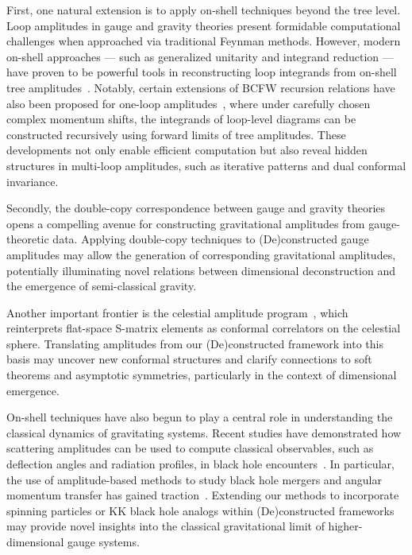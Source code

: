 \documentclass[12pt]{article}
\numberwithin{equation}{section}
\begin{document}
First, one natural extension is to apply on-shell techniques beyond the tree level. Loop amplitudes in gauge and gravity theories present formidable computational challenges when approached via traditional Feynman methods. However, modern on-shell approaches — such as generalized unitarity and integrand reduction — have proven to be powerful tools in reconstructing loop integrands from on-shell tree amplitudes~\cite{Bern:1994zx}. Notably, certain extensions of BCFW recursion relations have also been proposed for one-loop amplitudes~\cite{Kharel:2011vz}, where under carefully chosen complex momentum shifts, the integrands of loop-level diagrams can be constructed recursively using forward limits of tree amplitudes. These developments not only enable efficient computation but also reveal hidden structures in multi-loop amplitudes, such as iterative patterns and dual conformal invariance.


Secondly, the double-copy correspondence between gauge and gravity theories~\cite{Bern:2010ue} opens a compelling avenue for constructing gravitational amplitudes from gauge-theoretic data. Applying double-copy techniques to (De)constructed gauge amplitudes may allow the generation of corresponding gravitational amplitudes, potentially illuminating novel relations between dimensional deconstruction and the emergence of semi-classical gravity.

Another important frontier is the celestial amplitude program~\cite{Pasterski:2017kqt}, which reinterprets flat-space S-matrix elements as conformal correlators on the celestial sphere. Translating amplitudes from our (De)constructed framework into this basis may uncover new conformal structures and clarify connections to soft theorems and asymptotic symmetries, particularly in the context of dimensional emergence.

On-shell techniques have also begun to play a central role in understanding the classical dynamics of gravitating systems. Recent studies have demonstrated how scattering amplitudes can be used to compute classical observables, such as deflection angles and radiation profiles, in black hole encounters~\cite{Guevara:2019fsj,Neill:2013wsa}. In particular, the use of amplitude-based methods to study black hole mergers and angular momentum transfer has gained traction~\cite{Aoki:2024boe}. Extending our methods to incorporate spinning particles or KK black hole analogs within (De)constructed frameworks may provide novel insights into the classical gravitational limit of higher-dimensional gauge systems.
\end{document}
